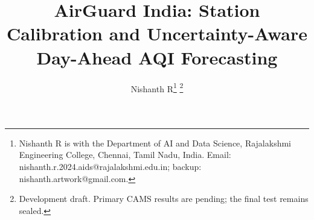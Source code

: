 \documentclass[journal]{IEEEtran}
\title{AirGuard India: Station Calibration and Uncertainty-Aware Day-Ahead AQI Forecasting}
\author{Nishanth R\thanks{Nishanth R is with the Department of AI and Data Science,
Rajalakshmi Engineering College, Chennai, Tamil Nadu, India.
Email: nishanth.r.2024.aids@rajalakshmi.edu.in; backup: nishanth.artwork@gmail.com.}
\thanks{Development draft. Primary CAMS results are pending; the final test remains sealed.}}
\begin{document}
\maketitle









\balance


\end{document}
